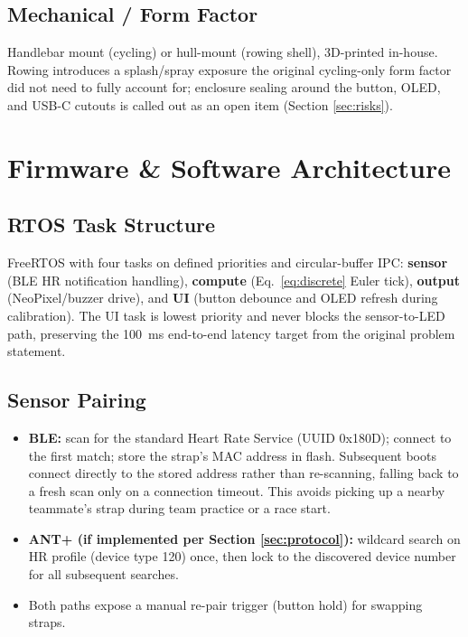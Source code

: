 \documentclass[11pt, letterpaper]{article}
\begin{document}
\subsection{Mechanical / Form Factor}

Handlebar mount (cycling) or hull-mount (rowing shell), 3D-printed in-house. Rowing introduces a
splash/spray exposure the original cycling-only form factor did not need to fully account for;
enclosure sealing around the button, OLED, and USB-C cutouts is called out as an open item
(Section \ref{sec:risks}).

\section{Firmware \& Software Architecture}

\subsection{RTOS Task Structure}

FreeRTOS with four tasks on defined priorities and circular-buffer IPC: \textbf{sensor} (BLE HR
notification handling), \textbf{compute} (Eq.~\eqref{eq:discrete} Euler tick), \textbf{output}
(NeoPixel/buzzer drive), and \textbf{UI} (button debounce and OLED refresh during calibration).
The UI task is lowest priority and never blocks the sensor-to-LED path, preserving the
\SI{100}{\milli\second} end-to-end latency target from the original problem statement.

\subsection{Sensor Pairing}

\begin{itemize}
  \item \textbf{BLE:} scan for the standard Heart Rate Service (UUID 0x180D); connect to the
    first match; store the strap's MAC address in flash. Subsequent boots connect directly to
    the stored address rather than re-scanning, falling back to a fresh scan only on a
    connection timeout. This avoids picking up a nearby teammate's strap during team practice
    or a race start.
  \item \textbf{ANT+ (if implemented per Section \ref{sec:protocol}):} wildcard search on HR
    profile (device type 120) once, then lock to the discovered device number for all
    subsequent searches.
  \item Both paths expose a manual re-pair trigger (button hold) for swapping straps.
\end{itemize}
\end{document}
